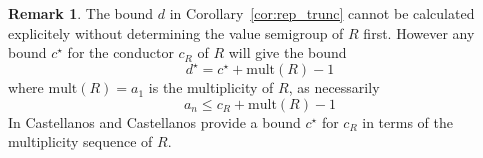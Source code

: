 \documentclass[12pt]{amsart}
\theoremstyle{plain}%
\theoremstyle{definition}
\newtheorem{notiz}{Remark}[section]
\renewcommand{\(}{\left(}
\renewcommand{\)}{\right)}
\renewcommand{\leq}{\leqslant}
\begin{document}
\begin{notiz}
The bound $d$ in Corollary~\ref{cor:rep_trunc} cannot be 
calculated explicitely without determining the value 
semigroup of $R$ first. However any bound $c^{\star}$ 
for the conductor $c_R$ of $R$ will give the bound 
	$$ d^{\star} = c^{\star} + \mathrm{mult}(R) - 1 $$
where $\mathrm{mult}(R) = a_1$ is the multiplicity of $R$, 
as necessarily 
	$$ a_n \leq c_R + \mathrm{mult}(R) - 1 $$ 
In \cite[\S 1]{CC}  Castellanos and Castellanos provide a 
bound $c^{\star}$ for $c_R$ in terms of the multiplicity 
sequence of $R$. 
\end{notiz}


%










\end{document}
